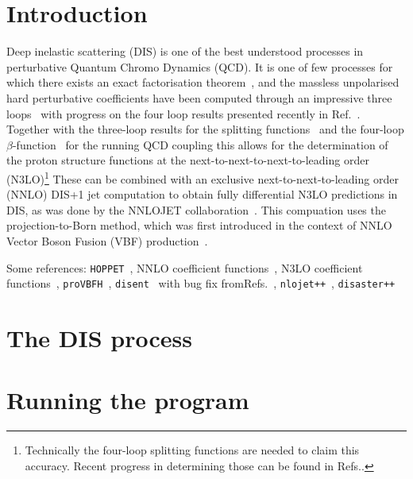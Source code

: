 \documentclass[submission, PhysCodeb]{SciPost}
\newcommand{\hoppet}{{\tt HOPPET}}
\newcommand{\disent}{{\tt disent}}
\newcommand{\provbfh}{{\tt proVBFH}}
\newcommand{\disaster}{{\tt disaster++}}
\newcommand{\nlojet}{{\tt nlojet++}}
\begin{document}
\section{Introduction}
\label{sec:intro}
Deep inelastic scattering (DIS) is one of the best understood
processes in perturbative Quantum Chromo Dynamics (QCD). It is one of
few processes for which there exists an exact factorisation
theorem~\cite{Collins:1987pm,Collins:1989gx}, and the massless
unpolarised hard perturbative coefficients have been computed through
an impressive three
loops~\cite{SanchezGuillen:1990iq,vanNeerven:1991nn,Zijlstra:1992qd,Zijlstra:1992kj,vanNeerven:1999ca,vanNeerven:2000uj,Moch:1999eb,Moch:2004xu,Vermaseren:2005qc,Vogt:2006bt,Moch:2007rq,Davies:2016ruz}
with progress on the four loop results presented recently in
Ref.~\cite{Moch:2022frw}. Together with the three-loop results for the
splitting functions~\cite{Moch:2004pa,Vogt:2004mw} and the four-loop
$\beta$-function~\cite{vanRitbergen:1997va,Czakon:2004bu} for the
running QCD coupling this allows for the determination of the proton
structure functions at the next-to-next-to-next-to-leading order
(N3LO)\footnote{Technically the four-loop splitting functions are
needed to claim this accuracy. Recent progress in determining those
can be found in
Refs.\cite{Moch:2021qrk,Falcioni:2023luc,Falcioni:2023vqq,Gehrmann:2023cqm}.}
These can be combined with an exclusive next-to-next-to-leading order
(NNLO) DIS+1 jet computation to obtain fully differential N3LO
predictions in DIS, as was done by the NNLOJET
collaboration~\cite{Currie:2018fgr,Gehrmann:2018odt}. This compuation
uses the projection-to-Born method, which was first introduced in the
context of NNLO Vector Boson Fusion (VBF)
production~\cite{Cacciari:2015jma}.



Some references: \hoppet{}~\cite{Salam:2008qg}, NNLO coefficient
functions~\cite{vanNeerven:1999ca,vanNeerven:2000uj}, N3LO coefficient
functions~\cite{Moch:2004xu,Vermaseren:2005qc,Moch:2008fj,Davies:2016ruz},
\provbfh{}~\cite{Cacciari:2015jma}, \disent{}~\cite{Catani:1996vz}
with bug fix fromRefs.~\cite{Borsa:2020ulb,Borsa:2020yxh},
\nlojet{}~\cite{Nagy:2001xb}, \disaster{}~\cite{Graudenz:1997gv}

\section{The DIS process}
\label{sed:dis}

\section{Running the program}
\label{sec:running}
\end{document}
